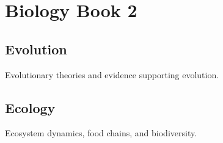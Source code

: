 \chapter{Biology Book 2}

\section{Evolution}
Evolutionary theories and evidence supporting evolution.

\section{Ecology}
Ecosystem dynamics, food chains, and biodiversity.
